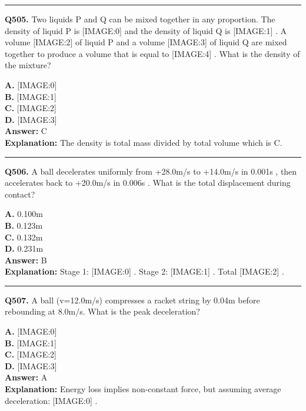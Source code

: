 \documentclass[12pt]{article}
\begin{document}
\hrule
\vspace{1em}


\noindent
\textbf{Q505.} Two liquids P and Q can be mixed together in any proportion. The density of liquid P is
[IMAGE:0]
and the density of liquid Q is
[IMAGE:1]
. A volume
[IMAGE:2]
of liquid P and a volume
[IMAGE:3]
of liquid Q are mixed together to produce a volume that is equal to
[IMAGE:4]
. What is the density of the mixture?



\textbf{A.} [IMAGE:0] \\
\textbf{B.} [IMAGE:1] \\
\textbf{C.} [IMAGE:2] \\
\textbf{D.} [IMAGE:3] \\

\textbf{Answer:} C \\
\textbf{Explanation:} The density is total mass divided by total volume which is C.

\hrule
\vspace{1em}


\noindent
\textbf{Q506.} A ball decelerates uniformly from +28.0m/s
to +14.0m/s
in 0.001s
, then accelerates back to +20.0m/s
in 0.006s
.
What is the total displacement during contact?



\textbf{A.} 0.100m \\
\textbf{B.} 0.123m \\
\textbf{C.} 0.132m \\
\textbf{D.} 0.231m \\

\textbf{Answer:} B \\
\textbf{Explanation:} Stage 1:
[IMAGE:0]
. Stage 2:
[IMAGE:1]
. Total
[IMAGE:2]
.

\hrule
\vspace{1em}


\noindent
\textbf{Q507.} A ball (v=12.0m/s)
compresses a racket string by 0.04m
before rebounding at 8.0m/s.
What is the peak deceleration?



\textbf{A.} [IMAGE:0] \\
\textbf{B.} [IMAGE:1] \\
\textbf{C.} [IMAGE:2] \\
\textbf{D.} [IMAGE:3] \\

\textbf{Answer:} A \\
\textbf{Explanation:} Energy loss implies non-constant force, but assuming average deceleration:
[IMAGE:0]
.
\end{document}
